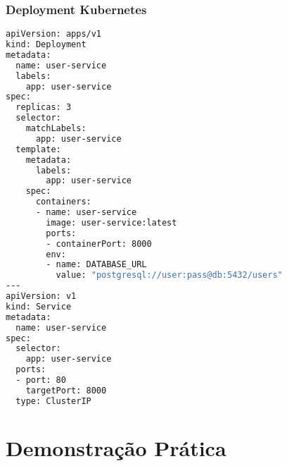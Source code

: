 \documentclass[aspectratio=169]{beamer}
\begin{document}
\begin{frame}[fragile]
    \frametitle{Deployment Kubernetes}
    \begin{lstlisting}[language=bash]
apiVersion: apps/v1
kind: Deployment
metadata:
  name: user-service
  labels:
    app: user-service
spec:
  replicas: 3
  selector:
    matchLabels:
      app: user-service
  template:
    metadata:
      labels:
        app: user-service
    spec:
      containers:
      - name: user-service
        image: user-service:latest
        ports:
        - containerPort: 8000
        env:
        - name: DATABASE_URL
          value: "postgresql://user:pass@db:5432/users"
---
apiVersion: v1
kind: Service
metadata:
  name: user-service
spec:
  selector:
    app: user-service
  ports:
  - port: 80
    targetPort: 8000
  type: ClusterIP
    \end{lstlisting}
\end{frame}

\section{Demonstração Prática}
\end{document}

